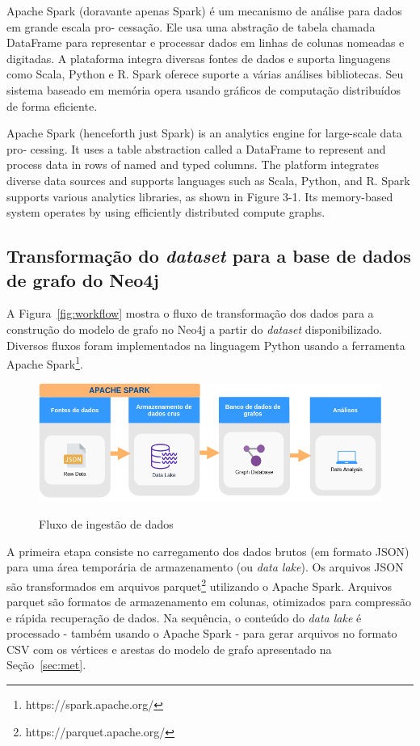 Apache Spark (doravante apenas Spark) é um mecanismo de análise para dados em grande escala pro‐
cessação. Ele usa uma abstração de tabela chamada DataFrame para representar e processar dados em
linhas de colunas nomeadas e digitadas. A plataforma integra diversas fontes de dados e
suporta linguagens como Scala, Python e R. Spark oferece suporte a várias análises
bibliotecas. Seu sistema baseado em memória opera usando gráficos de computação distribuídos de forma eficiente.

Apache Spark (henceforth just Spark) is an analytics engine for large-scale data pro‐
cessing. It uses a table abstraction called a DataFrame to represent and process data in
rows of named and typed columns. The platform integrates diverse data sources and
supports languages such as Scala, Python, and R. Spark supports various analytics
libraries, as shown in Figure 3-1. Its memory-based system operates by using efficiently distributed compute graphs.


\subsection{Transformação do \emph{dataset} para a base de dados de grafo do Neo4j}
\label{subsec:work}

A Figura~\ref{fig:workflow} mostra o fluxo de transformação dos dados para a construção do modelo de grafo no Neo4j a partir do \emph{dataset} disponibilizado. Diversos fluxos foram implementados na linguagem Python usando a ferramenta Apache Spark\footnote{https://spark.apache.org/}. 


 \begin{figure}[!h]
 \caption{Fluxo de ingestão de dados}
     \centering
     \includegraphics[scale=.45]{./Capitulo3/img/data-flow.png}
         \label{fig:dataflow}
 \end{figure}
 
 
A primeira etapa consiste no carregamento dos dados brutos (em formato JSON) para uma área temporária de armazenamento (ou \emph{data lake}). Os arquivos JSON são transformados em arquivos parquet\footnote{https://parquet.apache.org/} \cite{Boufea:17} utilizando o Apache Spark. Arquivos parquet são formatos de armazenamento em colunas, otimizados para compressão e rápida recuperação de dados. 
Na sequência, o conteúdo do \emph{data lake} é processado - também usando o Apache Spark - para gerar arquivos no formato CSV com os vértices e arestas do modelo de grafo apresentado na Seção~\ref{sec:met}. 

